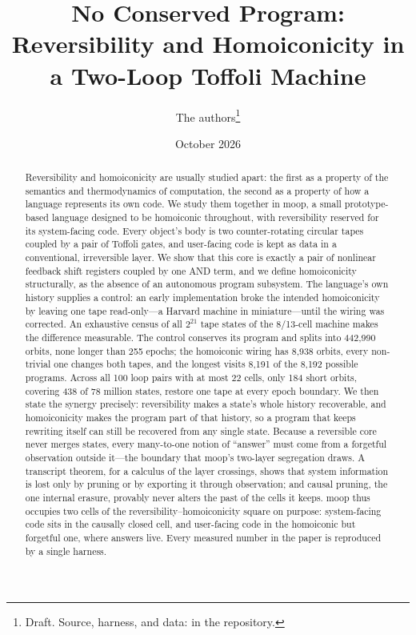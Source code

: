 \documentclass[11pt]{article}
\title{No Conserved Program:\\[2pt]
  \large Reversibility and Homoiconicity in a Two-Loop Toffoli Machine}
\author{The \moop{} authors\thanks{Draft. Source, harness, and data:
  \code{docs/paper/} in the \moop{} repository.}}
\date{October 2026}
\theoremstyle{definition}
\theoremstyle{remark}
\newcommand{\moop}{\textsf{moop}}
\begin{document}
\maketitle

\begin{abstract}
Reversibility and homoiconicity are usually studied apart: the first as a
property of the semantics and thermodynamics of computation, the second as
a property of how a language represents its own code. We study them
together in \moop{}, a small prototype-based language designed to be
homoiconic throughout, with reversibility reserved for its system-facing
code. Every object's body is two counter-rotating circular tapes coupled
by a pair of Toffoli gates, and user-facing code is kept as data in a
conventional, irreversible layer. We show that this core is exactly a pair of nonlinear feedback
shift registers coupled by one AND term, and we define homoiconicity
structurally, as the absence of an autonomous program subsystem. The
language's own history supplies a control: an early implementation broke
the intended homoiconicity by leaving one tape read-only---a Harvard
machine in miniature---until the wiring was corrected. An exhaustive census
of all $2^{21}$ tape states of the 8/13-cell machine makes the difference
measurable. The control conserves its program and splits into 442,990
orbits, none longer than 255 epochs; the homoiconic wiring has 8,938
orbits, every non-trivial one changes both tapes, and the longest visits
8,191 of the 8,192 possible programs. Across all 100 loop pairs with at
most 22 cells, only 184 short orbits, covering 438 of 78 million states,
restore one tape at every epoch boundary. We then state the synergy
precisely: reversibility makes a state's whole history recoverable, and
homoiconicity makes the program part of that history, so a program that
keeps rewriting itself can still be recovered from any single state.
Because a reversible core never merges states, every many-to-one notion
of ``answer'' must come from a forgetful observation outside it---the
boundary that \moop{}'s two-layer segregation draws. A transcript
theorem, for a calculus of the layer crossings, shows that system
information is lost only by pruning or by exporting it through
observation; and causal pruning, the one internal erasure, provably never
alters the past of the cells it keeps. \moop{} thus occupies two cells of
the reversibility--homoiconicity square on purpose: system-facing code
sits in the causally closed cell, and user-facing code in the homoiconic
but forgetful one, where answers live. Every measured number in the paper is reproduced
by a single harness.
\end{abstract}
\end{document}
